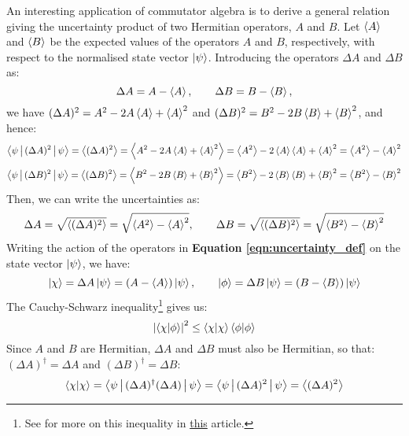 An interesting application of commutator algebra is to derive a general relation giving the uncertainty product of two Hermitian operators, $A$ and $B$. Let $\left\langle A\right\rangle$ and $\left\langle B\right\rangle$ be the expected values of the operators $A$ and $B$, respectively, with respect to the normalised state vector $\ket{\psi}$. Introducing the operators $\Delta A$ and $\Delta B$ as:
\begin{equation} \label{eqn:uncertainty_def}
    \Delta A = A - \left\langle A\right\rangle, \qquad \Delta B = B - \left\langle B\right\rangle,
\end{equation}
we have $(\Delta A)^2 = A^2 - 2A\left\langle A\right\rangle + \left\langle A\right\rangle^2$ and $(\Delta B)^2 = B^2 - 2B\left\langle B\right\rangle + \left\langle B\right\rangle^2$, and hence:
\begin{equation}
    \Braket{\psi|(\Delta A)^2|\psi} = \left\langle(\Delta A)^2\right\rangle = \left\langle A^2 - 2A\left\langle A\right\rangle + \left\langle A\right\rangle^2\right\rangle = \left\langle A^2\right\rangle - 2\left\langle A\right\rangle\left\langle A\right\rangle + \left\langle A\right\rangle^2 = \left\langle A^2\right\rangle - \left\langle A\right\rangle^2
\end{equation}
\begin{equation}
    \Braket{\psi|(\Delta B)^2|\psi} = \left\langle(\Delta B)^2\right\rangle = \left\langle B^2 - 2B\left\langle B\right\rangle + \left\langle B\right\rangle^2\right\rangle = \left\langle B^2\right\rangle - 2\left\langle B\right\rangle\left\langle B\right\rangle + \left\langle B\right\rangle^2 = \left\langle B^2\right\rangle - \left\langle B\right\rangle^2
\end{equation}
Then, we can write the uncertainties as:
\begin{equation}
    \Delta A = \sqrt{\left\langle(\Delta A)^2\right\rangle} = \sqrt{\left\langle A^2\right\rangle - \left\langle A\right\rangle^2}, \qquad \Delta B = \sqrt{\left\langle(\Delta B)^2\right\rangle} = \sqrt{\left\langle B^2\right\rangle - \left\langle B\right\rangle^2}
\end{equation}
Writing the action of the operators in \textbf{Equation \ref{eqn:uncertainty_def}} on the state vector $\ket{\psi}$, we have:
\begin{equation}
    \ket{\chi} = \Delta A\ket{\psi} = (A - \left\langle A\right\rangle)\ket{\psi}, \qquad \ket{\phi} = \Delta B\ket{\psi} = (B - \left\langle B\right\rangle)\ket{\psi}
\end{equation}
The Cauchy-Schwarz inequality\footnote{See for more on this inequality in \href{https://mathworld.wolfram.com/SchwarzsInequality.html}{this} article.} gives us:
\begin{equation}
    \left|\braket{\chi|\phi}\right|^2 \leq \braket{\chi|\chi}\braket{\phi|\phi}
\end{equation}
Since $A$ and $B$ are Hermitian, $\Delta A$ and $\Delta B$ must also be Hermitian, so that: $(\Delta A)^\dagger = \Delta A$ and $(\Delta B)^\dagger = \Delta B$:
\begin{equation}
    \braket{\chi|\chi} = \Braket{\psi|(\Delta A)^\dagger(\Delta A)|\psi} = \Braket{\psi|(\Delta A)^2|\psi} = \left\langle(\Delta A)^2\right\rangle
\end{equation}

